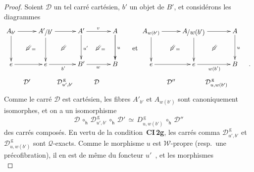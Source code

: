 \documentclass[francais]{smfart}
\theoremstyle{plain}
\theoremstyle{remark}
\theoremstyle{definition}
\numberwithin{equation}{thm}
\begin{document}
\begin{proof}
Soient $\mathcal D$ un tel carré cartésien, $b'$ un objet de $B'\!$, et considérons les diagrammes
\[
\xymatrixrowsep{.9pc}
\xymatrixcolsep{.9pc}
\UseAllTwocells
\xymatrix{
A_{b'}\ddrrcompositemap<\omit>{}
  \ar[rr]^{}
  \ar[dd]_{}
&&{\mathchoice {{A'}\raise -1.8pt\vbox{\hbox{$\kern -.8pt/{b'}$}}} {{A'}\raise -1.8pt\vbox{\hbox{$\kern -.8pt/{b'}$}}\kern .8pt} {{A'}\raise -1.8pt\vbox{\hbox{$\scriptstyle\kern -.8pt /{b'}$}}} {{A'}\raise -1.8pt\vbox{\hbox{$\scriptscriptstyle\kern -.8pt /{b'}$}}} }\ddrrcompositemap<\omit>{}
  \ar[rr]^{}
  \ar[dd]^(.55){\hskip -24pt =}
&&A'\ar[dd]^{u'}
  \ddrrcompositemap<\omit>{}
  \ar[rr]^{v}
&&A\ar[dd]^u
  \ar[dd]^(.55){\hskip -24pt =}
&&A_{w(b')}\ddrrcompositemap<\omit>{}
  \ar[rr]
  \ar[dd]
&\kern -40pt
&{\mathchoice {{A}\raise -1.8pt\vbox{\hbox{$\kern -.8pt/{w(b')}$}}} {{A}\raise -1.8pt\vbox{\hbox{$\kern -.8pt/{w(b')}$}}\kern .8pt} {{A}\raise -1.8pt\vbox{\hbox{$\scriptstyle\kern -.8pt /{w(b')}$}}} {{A}\raise -1.8pt\vbox{\hbox{$\scriptscriptstyle\kern -.8pt /{w(b')}$}}} }\ar[dd]^(.55){\hskip -30pt =}
  \ar[rr]\ddrrcompositemap<\omit>{}
&&A\ar[dd]^u
\\
&&&&&&&\hbox{\kern 5pt et\kern -10pt}
&&\kern -40pt
&&
\\
e\ar[rr]_{}
&&e\ar[rr]_{b'}
&&B'\ar[rr]_{w}
&&B
&&e\ar[rr]
&\kern -20pt
&e\ar[rr]_{w(b')}
&&B
&.
\\
&\kern -9pt\mathcal D'\kern -9pt
&&\kern -11pt \mathcal D^{\mathrm{\,g}}_{u',b'}\kern -10pt
&&\kern 3pt\kern -6pt \mathcal D \kern 3pt
&&&&\kern -16pt\mathcal D''\kern -16pt
&&\kern -17pt \mathcal D^{\mathrm{\,g}}_{u,w(b')}\kern -10pt
}
\]
Comme le carré $\mathcal D$ est cartésien, les fibres $A'_{b'}$ et $A_{w(b')}$ sont canoniquement isomorphes, et on a un isomorphisme 
\[
\mathcal D\,{\circ^{}_{\mathsf h}}\, \mathcal D^{\mathrm{\,g}}_{u',b'}\,{\circ^{}_{\mathsf h}}\, \mathcal D'\,\simeq\, D^{\mathrm{\,g}}_{u,w(b')}\,{\circ^{}_{\mathsf h}}\, \mathcal D''
\]
des carrés composés. En vertu de la condition~\textbf{CI\,2g}, les carrés comma $\mathcal D^{\mathrm{\,g}}_{u',b'}$ et $\mathcal D^{\mathrm{\,g}}_{u,w(b')}$ sont ${\mathcal{Q}}${\nobreakdash}-exacts. Comme le morphisme $u$ est ${\mathcal{W}}${\nobreakdash}-propre (resp.~une précofibration), il en est de même du foncteur $u'$~\cite[corollaire 3.2.4]{Ast}, et les morphismes
\[
\]
\end{proof}
\end{document}

